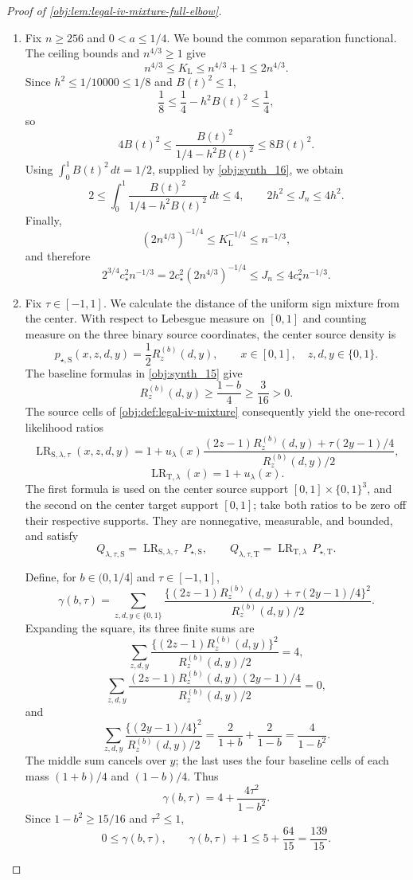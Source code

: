 \documentclass[11pt]{article}
\begin{document}
\begin{proof}[Proof of \cref{obj:lem:legal-iv-mixture-full-elbow}]
\begin{enumerate}
\item
Fix \(n\ge256\) and \(0<a\le1/4\). We bound the common separation functional. The ceiling bounds and \(n^{4/3}\ge1\) give
\[
n^{4/3}\le K_{\mathrm L}
\le n^{4/3}+1\le2n^{4/3}.
\]
Since \(h^2\le1/10000\le1/8\) and \(B(t)^2\le1\),
\[
\frac18\le\frac14-h^2B(t)^2\le\frac14,
\]
so
\[
4B(t)^2
\le\frac{B(t)^2}{1/4-h^2B(t)^2}
\le8B(t)^2.
\]
Using \(\int_0^1B(t)^2\,dt=1/2\), supplied by \cref{obj:synth_16}, we obtain
\[
2
\le\int_0^1\frac{B(t)^2}{1/4-h^2B(t)^2}\,dt
\le4,
\qquad
2h^2\le J_n\le4h^2.
\]
Finally,
\[
(2n^{4/3})^{-1/4}
\le K_{\mathrm L}^{-1/4}\le n^{-1/3},
\]
and therefore
\[
2^{3/4}c_{\star}^2n^{-1/3}
=
2c_{\star}^2(2n^{4/3})^{-1/4}
\le J_n
\le4c_{\star}^2n^{-1/3}.
\]

\item
Fix \(\tau\in[-1,1]\). We calculate the distance of the uniform sign mixture from the center. With respect to Lebesgue measure on \([0,1]\) and counting measure on the three binary source coordinates, the center source density is
\[
p_{\star,\mathrm S}(x,z,d,y)
=\frac12R_z^{(b)}(d,y),
\qquad
x\in[0,1],\quad z,d,y\in\{0,1\}.
\]
The baseline formulas in \cref{obj:synth_15} give
\[
R_z^{(b)}(d,y)\ge\frac{1-b}{4}\ge\frac3{16}>0.
\]
The source cells of \cref{obj:def:legal-iv-mixture} consequently yield the one-record likelihood ratios
\[
\operatorname{LR}_{\mathrm S,\lambda,\tau}(x,z,d,y)
=
1+
u_{\lambda}(x)
\frac{(2z-1)R_z^{(b)}(d,y)+\tau(2y-1)/4}
{R_z^{(b)}(d,y)/2},
\]
\[
\operatorname{LR}_{\mathrm T,\lambda}(x)=1+u_{\lambda}(x).
\]
The first formula is used on the center source support
\([0,1]\times\{0,1\}^3\), and the second on the center target support \([0,1]\); take both ratios to be zero off their respective supports. They are nonnegative, measurable, and bounded, and satisfy
\[
Q_{\lambda,\tau,\mathrm S}
=
\operatorname{LR}_{\mathrm S,\lambda,\tau}\,P_{\star,\mathrm S},
\qquad
Q_{\lambda,\tau,\mathrm T}
=
\operatorname{LR}_{\mathrm T,\lambda}\,P_{\star,\mathrm T}.
\]

Define, for \(b\in(0,1/4]\) and \(\tau\in[-1,1]\),
\[
\gamma(b,\tau)
=
\sum_{z,d,y\in\{0,1\}}
\frac{\{(2z-1)R_z^{(b)}(d,y)+\tau(2y-1)/4\}^2}
{R_z^{(b)}(d,y)/2}.
\]
Expanding the square, its three finite sums are
\[
\sum_{z,d,y}
\frac{\{(2z-1)R_z^{(b)}(d,y)\}^2}{R_z^{(b)}(d,y)/2}
=4,
\]
\[
\sum_{z,d,y}
\frac{(2z-1)R_z^{(b)}(d,y)(2y-1)/4}
{R_z^{(b)}(d,y)/2}
=0,
\]
and
\[
\sum_{z,d,y}
\frac{\{(2y-1)/4\}^2}{R_z^{(b)}(d,y)/2}
=
\frac2{1+b}+\frac2{1-b}
=\frac4{1-b^2}.
\]
The middle sum cancels over \(y\); the last uses the four baseline cells of each mass \((1+b)/4\) and \((1-b)/4\). Thus
\[
\gamma(b,\tau)=4+\frac{4\tau^2}{1-b^2}.
\]
Since \(1-b^2\ge15/16\) and \(\tau^2\le1\),
\[
0\le\gamma(b,\tau),
\qquad
\gamma(b,\tau)+1
\le5+\frac{64}{15}=\frac{139}{15}.
\]


\end{enumerate}
\end{proof}
\end{document}
